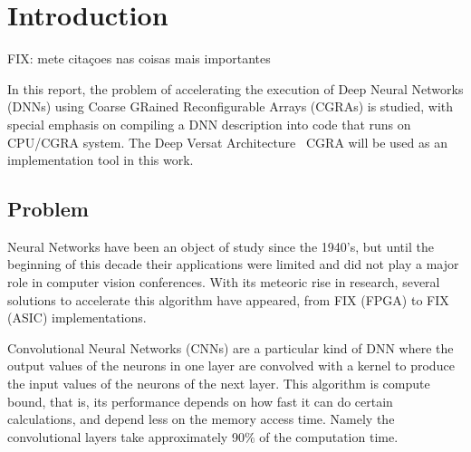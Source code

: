 
\chapter{Introduction}
\label{chapter:introduction}


FIX: mete citaçoes nas coisas mais importantes


In this report, the problem of accelerating the execution of Deep Neural
Networks (DNNs) using Coarse GRained Reconfigurable Arrays (CGRAs) is studied,
with special emphasis on compiling a DNN description into code that runs on
CPU/CGRA system. The Deep Versat Architecture~\cite{valter:deepversat} CGRA will be used as an
implementation tool in this work.


\section{Problem}
\label{section:problem}

Neural Networks have been an object of study since the 1940's, but until the
beginning of this decade their applications were limited and did not play a
major role in computer vision conferences. With its meteoric rise in research,
several solutions to accelerate this algorithm have appeared, from FIX (FPGA) to
FIX (ASIC) implementations.

Convolutional Neural Networks (CNNs) are a particular kind of DNN where the output
values of the neurons in one layer are convolved with a kernel to produce the
input values of the neurons of the next layer. This algorithm is compute bound,
that is, its performance depends on how fast it can do certain calculations, and
depend less on the memory access time. Namely the convolutional layers take
approximately 90$\%$ of the computation time.

